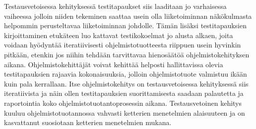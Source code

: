   Testausvetoisessa kehityksessä testitapaukset siis laaditaan jo varhaisessa vaiheessa jolloin niiden tekeminen saattaa usein olla liiketoiminnan näkökulmasta helpommin perusteltavaa liiketoiminnan johdolle.
  Tämän lisäksi testitapauksien kirjoittaminen etukäteen luo kattavat testikokoelmat jo alusta alkaen, joita voidaan hyödyntää iteratiivisesti ohjelmistotuotteesta riippuen usein hyvinkin pitkään, etenkin jos niihin tehdään tarvittavaa hienosäätöä ohjelmistokehityksen aikana.
  Ohjelmistokehittäjät voivat kehittää helposti hallittavissa olevia testitapauksien rajaavia kokonaisuuksia, jolloin ohjelmistotuote valmistuu ikään kuin pala kerrallaan.
  Itse ohjelmistokehitys on testausvetoisessa kehityksessä siis iteratiivista ja näin ollen testitapauksien suorittamisesta saadaan palautetta ja raportointia koko ohjelmistotuotantoprosessin aikana.
  Testausvetoinen kehitys kuuluu ohjelmistotuotannossa vahvasti ketterien menetelmien alaisuuteen ja on kasvattanut suosiotaan ketterien menetelmien mukana.
